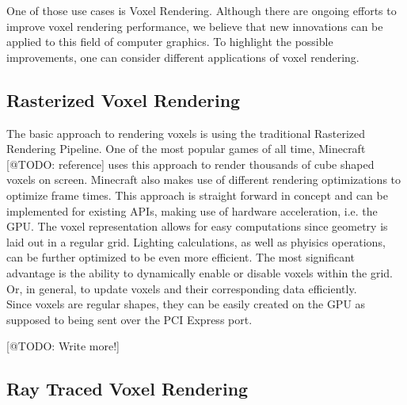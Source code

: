 \noindent
One of those use cases is Voxel Rendering. Although there are ongoing efforts to improve voxel 
rendering performance, we believe that new innovations can be applied to this field of computer 
graphics. To highlight the possible improvements, one can consider different applications of 
voxel rendering. 

\subsection{Rasterized Voxel Rendering}

The basic approach to rendering voxels is using the traditional Rasterized Rendering Pipeline.
One of the most popular games of all time, Minecraft [@TODO: reference] uses this approach to 
render thousands of cube shaped voxels on screen. Minecraft also makes use of different rendering 
optimizations to optimize frame times. This approach is straight forward in concept and can be 
implemented for existing \ac{API}s, making use of hardware acceleration, i.e. the \ac{GPU}.
The voxel representation allows for easy computations since geometry is laid out in a regular grid.
Lighting calculations, as well as phyisics operations, can be further optimized to be even more 
efficient. The most significant advantage is the ability to dynamically enable or disable voxels 
within the grid. Or, in general, to update voxels and their corresponding data efficiently.\\

\noindent
Since voxels are regular shapes, they can be easily created on the \ac{GPU} as supposed to being 
sent over the PCI Express port. 

[@TODO: Write more!]


\subsection{Ray Traced Voxel Rendering}

